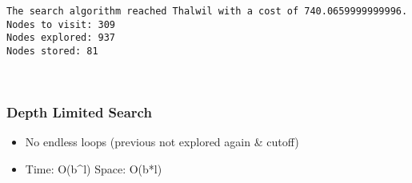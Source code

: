 \documentclass[11pt]{article}
\providecommand{\tightlist}{%
      \setlength{\itemsep}{0pt}\setlength{\parskip}{0pt}}
\begin{document}
    \begin{Verbatim}[commandchars=\\\{\}]
The search algorithm reached Thalwil with a cost of 740.0659999999996.
Nodes to visit: 309
Nodes explored: 937
Nodes stored: 81

    \end{Verbatim}

    \begin{center}
    \end{center}
    { \hspace*{\fill} \\}
    
    \hypertarget{depth-limited-search}{%
\subsubsection{Depth Limited Search}\label{depth-limited-search}}

\begin{itemize}
\tightlist
\item
  No endless loops (previous not explored again \& cutoff)
\item
  Time: O(b\^{}l) Space: O(b*l)
\end{itemize}
\end{document}
